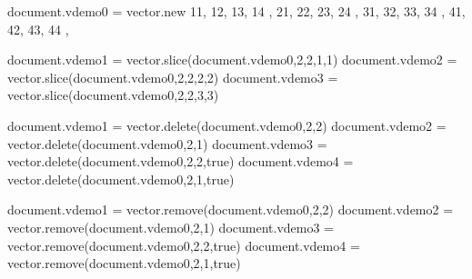 \typebuffer[option=TEX] \getbuffer

\startlinecorrection
{} {}
    {} {}
\stopcombination
\stoplinecorrection


\startbuffer
\startluacode
document.vdemo0 = vector.new {
    { 11, 12, 13, 14 },
    { 21, 22, 23, 24 },
    { 31, 32, 33, 34 },
    { 41, 42, 43, 44 },
}

document.vdemo1 = vector.slice(document.vdemo0,2,2,1,1)
document.vdemo2 = vector.slice(document.vdemo0,2,2,2,2)
document.vdemo3 = vector.slice(document.vdemo0,2,2,3,3)
\stopluacode
\stopbuffer

\typebuffer[option=TEX] \getbuffer

\startlinecorrection
{} {}
    {} {}
    {} {}
    {} {}
\stopcombination
\stoplinecorrection

\startbuffer
\startluacode
document.vdemo1 = vector.delete(document.vdemo0,2,2)
document.vdemo2 = vector.delete(document.vdemo0,2,1)
document.vdemo3 = vector.delete(document.vdemo0,2,2,true)
document.vdemo4 = vector.delete(document.vdemo0,2,1,true)
\stopluacode
\stopbuffer

\typebuffer[option=TEX] \getbuffer

\startlinecorrection
{} {}
    {} {}
    {} {}
    {} {}
    {} {}
\stopcombination
\stoplinecorrection

\startbuffer
\startluacode
document.vdemo1 = vector.remove(document.vdemo0,2,2)
document.vdemo2 = vector.remove(document.vdemo0,2,1)
document.vdemo3 = vector.remove(document.vdemo0,2,2,true)
document.vdemo4 = vector.remove(document.vdemo0,2,1,true)
\stopluacode
\stopbuffer

\typebuffer[option=TEX] \getbuffer

\startlinecorrection
{} {}
    {} {}
    {} {}
    {} {}
    {} {}
\stopcombination
\stoplinecorrection

